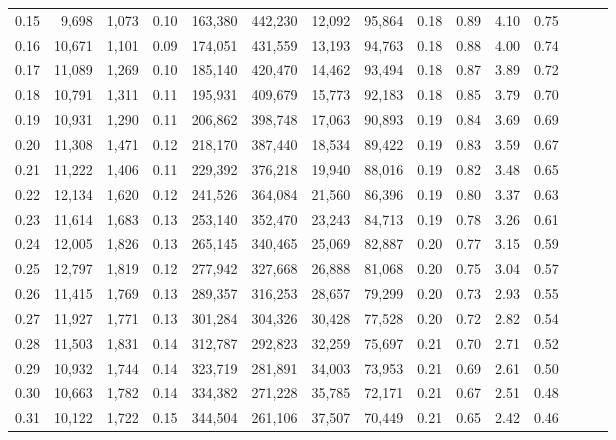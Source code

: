 \begin{tabular}{rrrrrrrrrrrrrrr}
0.15 &   9,698 &  1,073 &  0.10 &  163,380 &  442,230 &   12,092 &   95,864 &  0.18 &  0.89 &  4.10 &      0.75 \\
0.16 &  10,671 &  1,101 &  0.09 &  174,051 &  431,559 &   13,193 &   94,763 &  0.18 &  0.88 &  4.00 &      0.74 \\
0.17 &  11,089 &  1,269 &  0.10 &  185,140 &  420,470 &   14,462 &   93,494 &  0.18 &  0.87 &  3.89 &      0.72 \\
0.18 &  10,791 &  1,311 &  0.11 &  195,931 &  409,679 &   15,773 &   92,183 &  0.18 &  0.85 &  3.79 &      0.70 \\
0.19 &  10,931 &  1,290 &  0.11 &  206,862 &  398,748 &   17,063 &   90,893 &  0.19 &  0.84 &  3.69 &      0.69 \\
0.20 &  11,308 &  1,471 &  0.12 &  218,170 &  387,440 &   18,534 &   89,422 &  0.19 &  0.83 &  3.59 &      0.67 \\
0.21 &  11,222 &  1,406 &  0.11 &  229,392 &  376,218 &   19,940 &   88,016 &  0.19 &  0.82 &  3.48 &      0.65 \\
0.22 &  12,134 &  1,620 &  0.12 &  241,526 &  364,084 &   21,560 &   86,396 &  0.19 &  0.80 &  3.37 &      0.63 \\
0.23 &  11,614 &  1,683 &  0.13 &  253,140 &  352,470 &   23,243 &   84,713 &  0.19 &  0.78 &  3.26 &      0.61 \\
0.24 &  12,005 &  1,826 &  0.13 &  265,145 &  340,465 &   25,069 &   82,887 &  0.20 &  0.77 &  3.15 &      0.59 \\
0.25 &  12,797 &  1,819 &  0.12 &  277,942 &  327,668 &   26,888 &   81,068 &  0.20 &  0.75 &  3.04 &      0.57 \\
0.26 &  11,415 &  1,769 &  0.13 &  289,357 &  316,253 &   28,657 &   79,299 &  0.20 &  0.73 &  2.93 &      0.55 \\
0.27 &  11,927 &  1,771 &  0.13 &  301,284 &  304,326 &   30,428 &   77,528 &  0.20 &  0.72 &  2.82 &      0.54 \\
0.28 &  11,503 &  1,831 &  0.14 &  312,787 &  292,823 &   32,259 &   75,697 &  0.21 &  0.70 &  2.71 &      0.52 \\
0.29 &  10,932 &  1,744 &  0.14 &  323,719 &  281,891 &   34,003 &   73,953 &  0.21 &  0.69 &  2.61 &      0.50 \\
0.30 &  10,663 &  1,782 &  0.14 &  334,382 &  271,228 &   35,785 &   72,171 &  0.21 &  0.67 &  2.51 &      0.48 \\
0.31 &  10,122 &  1,722 &  0.15 &  344,504 &  261,106 &   37,507 &   70,449 &  0.21 &  0.65 &  2.42 &      0.46 \\

\end{tabular}
